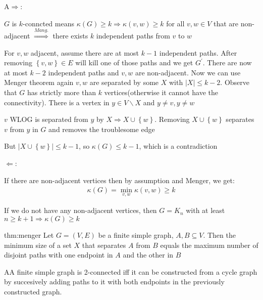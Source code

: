 \begin{prf}
  A$\Rightarrow$:\par
  $G$ is $k$-conncted means $\kappa(G)\geq k\Rightarrow\kappa(v,w)\geq k$ for all $v,w\in V$ that are non-adjacent $\stackrel{Mang.}{\Rightarrow}$ there exists $k$ independent paths from $v$ to $w$
  \par\bigskip
\noindent For $v,w$ adjacent, assume there are at most $k-1$ independent paths. After removing $\left\{v,w\right\}\in E$ will kill one of those paths and we get $G^{\prime}$. There are now at most $k-2$ independent paths and $v,w$ are non-adjacent. Now we can use Menger theorem again $v,w$ are separated by some $X$ with $\left|X\right|\leq k-2$. Observe that $G$ has strictly more than $k$ vertices(otherwise it cannot have the connectivity). There is a vertex in $y\in V\backslash X$ and $y\neq v, y\neq w$\par
\noindent $v$ WLOG is separated from $y$ by $X\Rightarrow X\cup \left\{w\right\}$. Removing $X\cup \left\{w\right\}$ separates $v$ from $y$ in $G$ and removes the troublesome edge\par
\noindent But $\left|X\cup\left\{w\right\}\right|\leq k-1$, so $\kappa(G)\leq k-1$, which is a contradiction
\par\bigskip
$\Leftarrow$:\par
If there are non-adjacent vertices then by assumption and Menger, we get:
\begin{equation*}
  \begin{gathered}
    \kappa(G) = \min_{v,w}\kappa(v,w)\geq k
  \end{gathered}
\end{equation*}\par
\noindent If we do not have any non-adjacent vertices, then $G = K_n$ with at least $n\geq k+1\Rightarrow\kappa(G)\geq k$
\end{prf}
\par\bigskip
\begin{theo}[Menger V2]{thm:menger}
  Let $G = (V,E)$ be a finite simple graph, $A,B\subseteq V$. Then the minimum size of a set $X$ that separates $A$ from $B$ equals the maximum number of disjoint paths with one endpoint in $A$ and the other in $B$
\end{theo}
\par\bigskip
\begin{theo}
  AA finite simple graph is 2-connected iff it can be constructed from a cycle graph by succesively adding paths to it with both endpoints in the previously constructed graph.
\end{theo}
